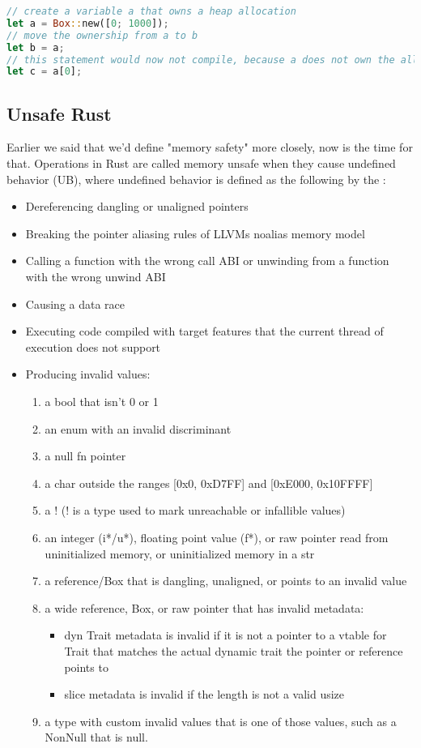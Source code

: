 \begin{lstlisting}[language=Rust,style=colouredRust]
// create a variable a that owns a heap allocation
let a = Box::new([0; 1000]);
// move the ownership from a to b
let b = a;
// this statement would now not compile, because a does not own the allocation anymore
let c = a[0];
\end{lstlisting}

\subsection{Unsafe Rust}
\label{sec:background:rust:unsafe}

Earlier we said that we'd define "memory safety" more closely, now is the time for that.
Operations in Rust are called memory unsafe when they cause undefined behavior (UB),
where undefined behavior is defined as the following by the \cite{Rustonomicon}:
\begin{itemize}
    \item Dereferencing dangling or unaligned pointers
    \item Breaking the pointer aliasing rules of LLVMs noalias memory model
    \item Calling a function with the wrong call ABI or unwinding from a function with the wrong unwind ABI
    \item Causing a data race
    \item Executing code compiled with target features that the current thread of execution does not support
    \item Producing invalid values:
    \begin{enumerate}
        \item a bool that isn't 0 or 1
        \item an enum with an invalid discriminant
        \item a null fn pointer
        \item a char outside the ranges [0x0, 0xD7FF] and [0xE000, 0x10FFFF]
        \item a ! (! is a type used to mark unreachable or infallible values)
        \item an integer (i*/u*), floating point value (f*), or raw pointer read from uninitialized memory, or uninitialized memory in a str
        \item a reference/Box that is dangling, unaligned, or points to an invalid value
        \item a wide reference, Box, or raw pointer that has invalid metadata:
        \begin{itemize}
            \item dyn Trait metadata is invalid if it is not a pointer to a vtable for Trait that matches the actual dynamic trait the pointer or reference points to
            \item slice metadata is invalid if the length is not a valid usize
        \end{itemize}
        \item a type with custom invalid values that is one of those values, such as a NonNull that is null.
    \end{enumerate}
\end{itemize}

